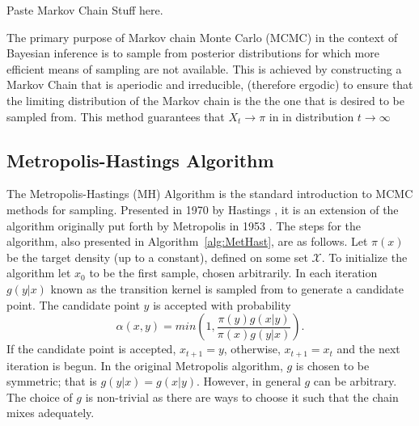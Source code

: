   Paste Markov Chain Stuff here. 
	

  The primary purpose of Markov chain Monte Carlo (MCMC) in the context of Bayesian inference is to sample from posterior distributions for which more efficient means of sampling are not available.
	{\color{red}This is achieved by constructing a Markov Chain that is aperiodic and irreducible, (therefore ergodic) to ensure that the limiting distribution of the Markov chain is the the one that is desired to be sampled from. This method guarantees that $X_t\rightarrow\pi$ in in distribution $t\rightarrow\infty$}
	\subsection{Metropolis-Hastings Algorithm}
	The Metropolis-Hastings (MH) Algorithm is the standard introduction to MCMC methods for sampling. Presented in 1970 by Hastings \cite{hastings1970monte}, it is an extension of the algorithm originally put forth by Metropolis in 1953 \cite{metropolis1953equation}.
	The steps for the algorithm, also presented in Algorithm~\ref{alg:MetHast}, are as follows. Let $\pi(x)$ be the target density (up to a constant), defined on some set ${\mathscr X}$.
	To initialize the algorithm let $x_0$ to be the first sample, chosen arbitrarily. In each iteration $g(y|x)$ 
    known as the {\color{red}transition kernel} is sampled from to generate a candidate point. The candidate point $y$ is accepted with probability 
	    \begin{equation}
	        \alpha(x,y) = min\left(1,\frac{\pi(y)g(x|y)}{\pi(x)g(y|x)}\right).
	    \end{equation}
	If the candidate point is accepted, $x_{t+1} = y$, otherwise, $x_{t+1} = x_t$ and the next iteration is begun. In the original Metropolis algorithm, $g$ is chosen to be symmetric; that is $g(y|x) = g(x|y)$. However, in general $g$ can be arbitrary. The choice of $g$ is non-trivial as there are ways to choose it such that the chain mixes adequately. %
	
